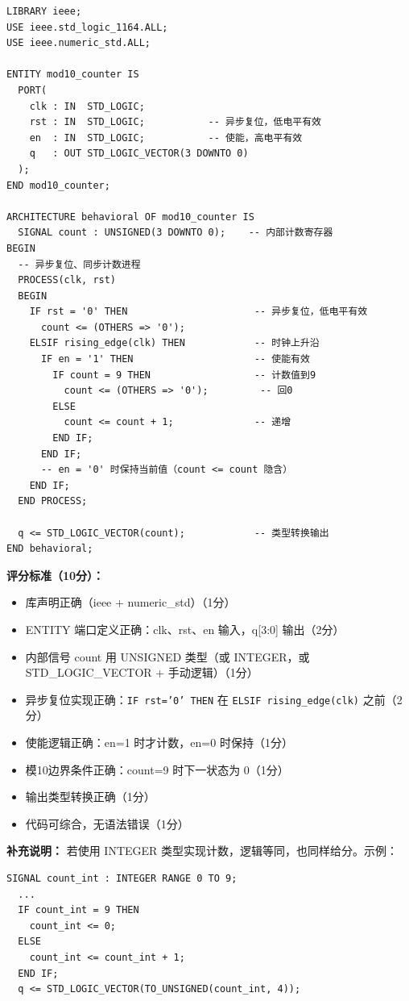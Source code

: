 \begin{lstlisting}[style=Vivado]
LIBRARY ieee;
USE ieee.std_logic_1164.ALL;
USE ieee.numeric_std.ALL;

ENTITY mod10_counter IS
  PORT(
    clk : IN  STD_LOGIC;
    rst : IN  STD_LOGIC;           -- 异步复位，低电平有效
    en  : IN  STD_LOGIC;           -- 使能，高电平有效
    q   : OUT STD_LOGIC_VECTOR(3 DOWNTO 0)
  );
END mod10_counter;

ARCHITECTURE behavioral OF mod10_counter IS
  SIGNAL count : UNSIGNED(3 DOWNTO 0);    -- 内部计数寄存器
BEGIN
  -- 异步复位、同步计数进程
  PROCESS(clk, rst)
  BEGIN
    IF rst = '0' THEN                      -- 异步复位，低电平有效
      count <= (OTHERS => '0');
    ELSIF rising_edge(clk) THEN            -- 时钟上升沿
      IF en = '1' THEN                     -- 使能有效
        IF count = 9 THEN                  -- 计数值到9
          count <= (OTHERS => '0');         -- 回0
        ELSE
          count <= count + 1;              -- 递增
        END IF;
      END IF;
      -- en = '0' 时保持当前值（count <= count 隐含）
    END IF;
  END PROCESS;

  q <= STD_LOGIC_VECTOR(count);            -- 类型转换输出
END behavioral;
\end{lstlisting}

\textbf{评分标准（10分）：}
\begin{itemize}
    \item 库声明正确（ieee + numeric\_std）（1分）
    \item ENTITY 端口定义正确：clk、rst、en 输入，q[3:0] 输出（2分）
    \item 内部信号 count 用 UNSIGNED 类型（或 INTEGER，或 STD\_LOGIC\_VECTOR + 手动逻辑）（1分）
    \item 异步复位实现正确：\texttt{IF rst='0' THEN} 在 \texttt{ELSIF rising\_edge(clk)} 之前（2分）
    \item 使能逻辑正确：en=1 时才计数，en=0 时保持（1分）
    \item 模10边界条件正确：count=9 时下一状态为 0（1分）
    \item 输出类型转换正确（1分）
    \item 代码可综合，无语法错误（1分）
\end{itemize}

\textbf{补充说明：} 若使用 INTEGER 类型实现计数，逻辑等同，也同样给分。示例：
\begin{lstlisting}[style=Vivado]
  SIGNAL count_int : INTEGER RANGE 0 TO 9;
  ...
  IF count_int = 9 THEN
    count_int <= 0;
  ELSE
    count_int <= count_int + 1;
  END IF;
  q <= STD_LOGIC_VECTOR(TO_UNSIGNED(count_int, 4));
\end{lstlisting}

